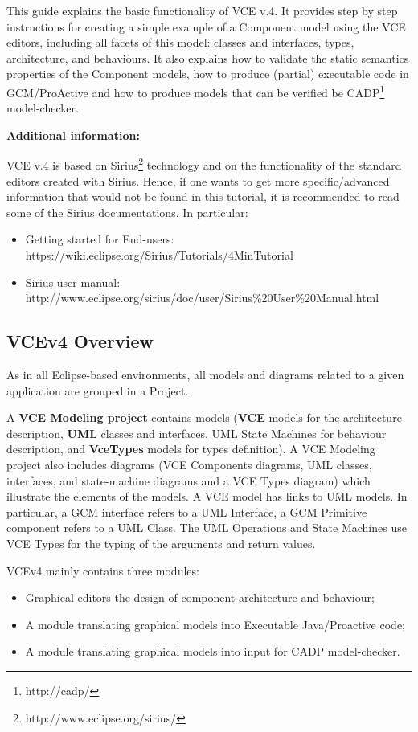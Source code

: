 \documentclass[12pt]{article}
\begin{document}
This guide explains the basic functionality of VCE v.4. 
It provides step by step instructions for creating a simple example of a Component model using the VCE editors, including all facets of this model: classes and interfaces, types, architecture, and behaviours. It also explains how to validate the static semantics properties of the Component models, how to produce (partial) executable code in GCM/ProActive and how to produce models that can be verified be CADP\footnote{http://cadp/} model-checker.

\textbf{Additional information:}

VCE v.4 is based on Sirius\footnote{http://www.eclipse.org/sirius/} technology and on the functionality of the standard editors created with Sirius. Hence, if one wants to get more specific/advanced information that would not be found in this tutorial, it is recommended to read some of the Sirius documentations. In particular:
\begin{itemize}
\item
Getting started for End-users: https://wiki.eclipse.org/Sirius/Tutorials/4MinTutorial
\item
Sirius user manual: http://www.eclipse.org/sirius/doc/user/Sirius\%20User\%20Manual.html
\end{itemize}

\subsection{VCEv4 Overview}
As in all Eclipse-based environments, all models and diagrams related to a given application are grouped in a Project. 

A \textbf{VCE Modeling project} contains models (\textbf{VCE} models for the architecture description, \textbf{UML} classes and interfaces, UML State Machines for behaviour description, and \textbf{VceTypes} models for types definition). A VCE Modeling project also includes  diagrams (VCE Components diagrams, UML classes, interfaces, and state-machine diagrams and a VCE Types diagram) which illustrate the elements of the models. A VCE model has links to UML models. In particular, a GCM interface refers to a UML Interface, a GCM Primitive component refers to a UML Class. The UML Operations and State Machines use VCE Types for the typing of the arguments and return values. 

VCEv4 mainly contains three modules:
\begin{itemize}
\item
Graphical editors the design of component architecture and behaviour;
\item
A module translating graphical models into Executable Java/Proactive code;
\item
A module translating graphical models into input for CADP model-checker.
\end{itemize}
\end{document}
